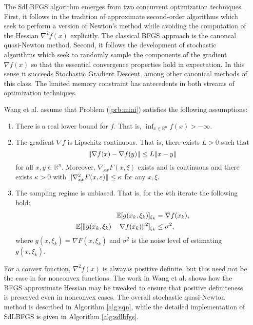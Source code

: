 \documentclass{article}
\newcommand{\RR}{\mathbb{R}}
\DeclarePairedDelimiter{\norm}{\|}{\|}
\DeclarePairedDelimiter{\ex}{\mathbb{E}[}{]}
\begin{document}
The SdLBFGS algorithm emerges from two concurrent optimization techniques.
First, it follows in the tradition of approximate second-order algorithms which
seek to perform a version of Newton's method while avoiding the computation of
the Hessian $\nabla^2 f(x)$ explicitly. The classical BFGS approach is the
canoncal quasi-Newton method. Second, it follows the development of stochastic
algorithms which seek to randomly sample the components of the gradient $\nabla
f(x)$ so that the essential convergence properties hold in expectation. In this
sense it succeeds Stochastic Gradient Descent, among other canonical methods of
this class. The limited memory constraint has antecedents in both streams of
optimization techniques.

Wang et al. \cite{sdlbfgs} assume that Problem (\ref{prb:mini}) satisfies the
following assumptions:
\begin{enumerate}
  \item There is a real lower bound for $f$. That is, $\inf_{x \in \RR^n} f(x) >
    -\infty$.
  \item The gradient $\nabla f$ is Lipschitz continuous. That is, there exists
    $L > 0$ such that 
    \begin{equation*}
      \norm{\nabla f(x) - \nabla f(y)} \leq L \norm{x - y}
    \end{equation*}
    for all $x,y \in \RR^n$. Moreover, $\nabla_{xx} F(x, \xi)$ exists and is
    continuous and there exists $\kappa > 0$ with $\norm{\nabla^2_{xx} F(x,
    \varepsilon)} \leq \kappa$ for any $x, \xi$.
  \item The sampling regime is unbiased. That is, for the $k$th iterate the
    following hold:
    \begin{align*}
      \ex{g(x_k, \xi_k)}_{\xi_k} &= \nabla f(x_k), \\
      \ex{\norm{g(x_k, \xi_k) - \nabla f(x_k)}^2}_{\xi_k} &\leq \sigma^2,
    \end{align*}
    where $g(x, \xi_k) = \nabla F(x, \xi_k)$ and $\sigma^2$ is the noise level
    of estimating $g(x, \xi_k)$. 
\end{enumerate}

For a convex function, $\nabla^2 f(x)$ is alwayas positive definite, but this
need not be the case in for nonconvex functions. The work in Wang et al.
\cite{sdlbfgs} shows how the BFGS approximate Hessian may be tweaked to ensure
that positive definiteness is preserved even in nonconvex cases. The overall
stochastic quasi-Newton method is described in Algorithm \ref{alg:sqn}, while
the detailed implementation of SdLBFGS is given in Algorithm \ref{alg:sdlbfgs}.
\end{document}
